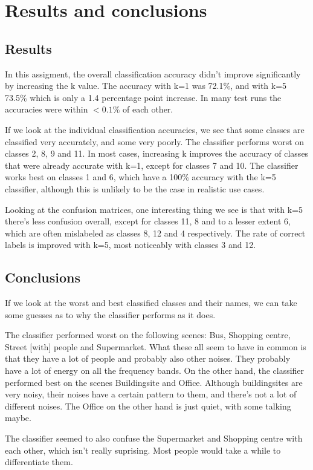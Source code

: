 \section{Results and conclusions}

\subsection{Results}
In this assigment, the overall classification accuracy didn't improve
significantly by increasing the k value. The accuracy with k=1 was 72.1\%, and
with k=5 73.5\% which is only a 1.4 percentage point increase. In many test
runs the accuracies were within \(<0.1\%\) of each other.

If we look at the individual classification accuracies, we see that some
classes are classified very accurately, and some very poorly. The classifier
performs worst on classes 2, 8, 9 and 11. In most cases, increasing k improves
the accuracy of classes that were already accurate with k=1, except for classes
7 and 10. The classifier works best on classes 1 and 6, which have a 100\%
accuracy with the k=5 classifier, although this is unlikely to be the case
in realistic use cases.

Looking at the confusion matrices, one interesting thing we see is that with
k=5 there's less confusion overall, except for classes 11, 8 and to a lesser
extent 6, which are often mislabeled as classes 8, 12 and 4 respectively. The
rate of correct labels is improved with k=5, most noticeably with classes 3 and
12.

\subsection{Conclusions}
If we look at the worst and best classified classes and their names, we can
take some guesses as to why the classifier performs as it does.

The classifier performed worst on the following scenes: Bus, Shopping centre,
Street [with] people and Supermarket. What these all seem to have in common is
that they have a lot of people and probably also other noises. They probably
have a lot of energy on all the frequency bands. On the other hand, the
classifier performed best on the scenes Buildingsite and Office.  Although
buildingsites are very noisy, their noises have a certain pattern to them, and
there's not a lot of different noises. The Office on the other hand is just
quiet, with some talking maybe.

The classifier seemed to also confuse the Supermarket and Shopping centre with
each other, which isn't really suprising. Most people would take a while to
differentiate them.

